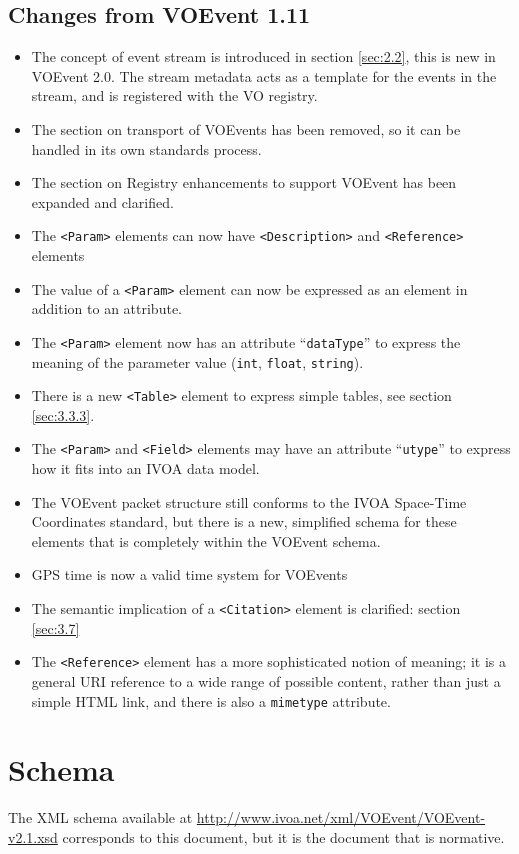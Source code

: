 \documentclass[11pt,a4paper]{ivoa}
\begin{document}
\subsection{Changes from VOEvent 1.11}
\begin{itemize}
\item The concept of event stream is introduced in section \ref{sec:2.2}, this is new in VOEvent 2.0. The stream metadata acts as a template for the events in the stream, and is registered with the VO registry. 
\item The section on transport of VOEvents has been removed, so it can be handled in its own standards process. 
\item The section on Registry enhancements to support VOEvent has been expanded and clarified. 
\item The {\tt <Param>} elements can now have {\tt <Description>} and {\tt <Reference>} elements 
\item The value of a {\tt <Param>} element can now be expressed as an element in addition to an attribute. 
\item The {\tt <Param>} element now has an attribute ``{\tt dataType}'' to express the meaning of the parameter value ({\tt int}, {\tt float}, {\tt string}). 
\item There is a new {\tt <Table>} element to express simple tables, see section \ref{sec:3.3.3}. 
\item The {\tt <Param>} and {\tt <Field>} elements may have an attribute ``{\tt utype}'' to express how it fits into an IVOA data model. 
\item The VOEvent packet structure still conforms to the IVOA Space-Time Coordinates standard, but there is a new, simplified schema for these elements that is completely within the VOEvent schema. 
\item GPS time is now a valid time system for VOEvents 
\item The semantic implication of a {\tt <Citation>} element is clarified: section \ref{sec:3.7} 
\item The {\tt <Reference>} element has a more sophisticated notion of meaning; it is a general URI reference to a wide range of possible content, rather than just a simple HTML link, and there is also a {\tt mimetype} attribute. 
\end{itemize}

\section{Schema}
\label{sec7}
The XML schema available at \url{http://www.ivoa.net/xml/VOEvent/VOEvent-v2.1.xsd} corresponds to this document, but it is the document that is normative. 
\end{document}
